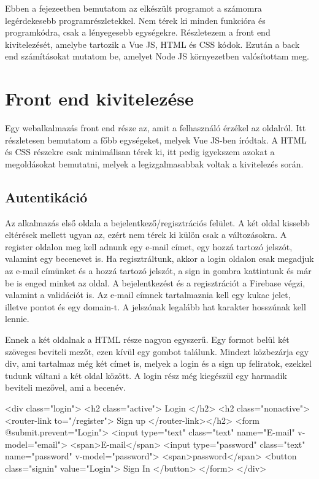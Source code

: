Ebben a fejezeetben bemutatom az elkészült programot a számomra legérdekesebb programrészletekkel. Nem térek ki minden funkcióra és programkódra, csak a lényegesebb egységekre. Részletezem a front end kivitelezését, amelybe tartozik a Vue JS, HTML és CSS kódok. Ezután a back end számításokat mutatom be, amelyet Node JS környezetben valósítottam meg.

\section{Front end kivitelezése}
Egy webalkalmazás front end része az, amit a felhasználó érzékel az oldalról. Itt részletesen bemutatom a főbb egységeket, melyek Vue JS-ben íródtak. A HTML és CSS részekre csak minimálisan térek ki, itt pedig igyekszem azokat a megoldásokat bemutatni, melyek a legizgalmasabbak voltak a kivitelezés során. 

\subsection{Autentikáció}
Az alkalmazás első oldala a bejelentkező/regisztrációs felület. A két oldal kissebb eltérések mellett ugyan az, ezért nem térek ki külön csak a változásokra. A register oldalon meg kell adnunk egy e-mail címet, egy hozzá tartozó jelszót, valamint egy becenevet is. Ha regisztráltunk, akkor a login oldalon csak megadjuk az e-mail címünket és a hozzá tartozó jelszót, a sign in gombra kattintunk és már be is enged minket az oldal. A bejelentkezést és a regisztrációt a Firebase végzi, valamint a validációt is. Az e-mail címnek tartalmaznia kell egy kukac jelet, illetve pontot és egy domain-t. A jelszónak legalább hat karakter hosszúnak kell lennie.

Ennek a két oldalnak a HTML része nagyon egyszerű. Egy formot belül két szöveges beviteli mezőt, ezen kívül egy gombot találunk. Mindezt közbezárja egy div, ami tartalmaz még két címet is, melyek a login és a sign up feliratok, ezekkel tudunk váltani a két oldal között. A login rész még kiegészül egy harmadik beviteli mezővel, ami a becenév.

\begin{python}
<div class="login">
  <h2 class="active"> Login </h2>
  <h2 class="nonactive"><router-link to="/register"> Sign up </router-link></h2> 
  <form @submit.prevent="Login">
    <input type="text" class="text" name="E-mail" v-model="email">
    <span>E-mail</span>
    <input type="password" class="text" name="password" v-model="password">
    <span>password</span>
    <button class="signin" value="Login">
      Sign In
    </button>
  </form>
</div>
\end{python}

